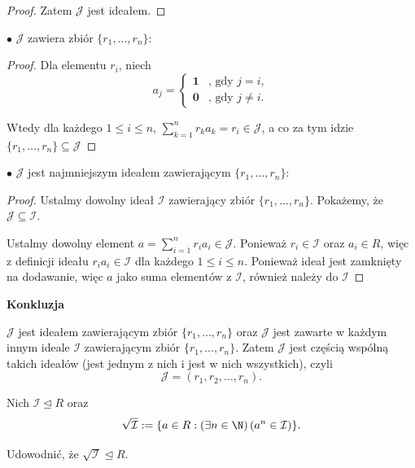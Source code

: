 \begin{solution}
\begin{proof}
		Zatem $\mathcal{J}$ jest ideałem.
	\end{proof} 

	\noindent $\bullet$ $\mathcal{J}$ zawiera zbiór $\{r_1,\ldots, r_{n}\}$:
	\begin{proof}

		Dla elementu $r_{i}$, niech 
		\[
		a_{j} =
		\begin{cases}
			\mathbf{1} &\text{, gdy } j = i,\\
			\mathbf{0} &\text{, gdy } j \neq i.
		\end{cases}
		\] 

		Wtedy dla każdego $1 \le i \le n$,  $\sum_{k=1}^{n} r_{k}a_{k} = r_{i} \in \mathcal{J}$, a co za tym idzie $\{r_1,\ldots,r_{n}\} \subseteq \mathcal{J}$
	\end{proof} 

	
	\noindent$\bullet$ $\mathcal{J}$ jest najmniejszym ideałem zawierającym $\{r_1,\ldots,r_{n}\} $:
	\begin{proof}

		Ustalmy dowolny ideał $\mathcal{I}$ zawierający zbiór $\{r_1,\ldots,r_{n}\}$. Pokażemy, że $\mathcal{J} \subseteq \mathcal{I}$.

		Ustalmy dowolny element $a = \sum_{i=1}^{n} r_{i}a_{i} \in \mathcal{J}$. Ponieważ $r_{i} \in \mathcal{I}$ oraz $a_{i} \in R$, więc z definicji ideału $r_{i}a_{i} \in \mathcal{I}$ dla każdego $1 \le i \le n$. Ponieważ ideał jest zamknięty na dodawanie, więc $a$ jako suma elementów z $\mathcal{I}$, również należy do $\mathcal{I}$ 
	\end{proof} 

	\noindent \textbf{Konkluzja} 

	$\mathcal{J}$ jest ideałem zawierającym zbiór $\{r_1,\ldots,r_{n}\} $ oraz $\mathcal{J}$ jest zawarte w każdym innym ideale $\mathcal{I}$ zawierającym zbiór $\{r_1,\ldots,r_{n}\} $. Zatem $\mathcal{J}$ jest częścią wspólną takich ideałów (jest jednym z nich i jest w nich wszystkich), czyli
	\[
	\mathcal{J} = \left( r_1,r_2,\ldots,r_{n} \right) 
	.\] 
\end{solution} 
\begin{problem}[2]
	Nich $\mathcal{I} \unlhd R$ oraz
	 \[
	\sqrt{\mathcal{I}} := \{a \in R: \left(\exists n\in \N \right)\left( a^{n}\in \mathcal{I} \right)  \} 
	.\] 

	Udowodnić, że $\sqrt{\mathcal{I}} \unlhd R$. 
\end{problem} 
